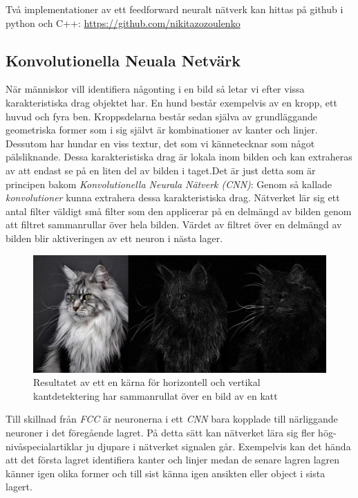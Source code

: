 \documentclass[a4paper,11pt,twoside]{article}
\begin{document}
Två implementationer av ett feedforward neuralt nätverk kan hittas på github i python och C++: \url{https://github.com/nikitazozoulenko}

\subsection{Konvolutionella Neuala Netvärk}
När människor vill identifiera någonting i en bild så letar vi efter vissa karakteristiska drag objektet har. En hund består exempelvis av en kropp, ett huvud och fyra ben. Kroppsdelarna består sedan själva av grundläggande geometriska former som i sig självt är kombinationer av kanter och linjer. Dessutom har hundar en viss textur, det som vi kännetecknar som något pälsliknande. Dessa karakteristiska drag är lokala inom bilden och kan extraheras av att endast se på en liten del av bilden i taget.Det är just detta som är principen bakom \textit{Konvolutionella Neurala Nätverk (CNN)}: Genom så kallade \textit{konvolutioner} kunna extrahera dessa karakteristiska drag. Nätverket lär sig ett antal filter väldigt små filter som den applicerar på en delmängd av bilden genom att filtret sammanrullar över hela bilden. Värdet av filtret över en delmängd av bilden blir aktiveringen av ett neuron i nästa lager. 

\begin{figure}[h]\label{figkatter}
	\centering
  		\includegraphics[scale=0.33]{katter.png}
  	\caption{Resultatet av ett en kärna för horizontell och vertikal kantdetektering har sammanrullat över en bild av en katt}
\end{figure}

Till skillnad från \textit{FCC} är neuronerna i ett \textit{CNN} bara kopplade till närliggande neuroner i det föregående lagret. På detta sätt kan nätverket lära sig fler hög-nivåspecialartiklar ju djupare i nätverket signalen går. Exempelvis kan det hända att det första lagret identifiera kanter och linjer medan de senare lagren lagren känner igen olika former och till sist känna igen ansikten eller object i sista lagert.
\end{document}
